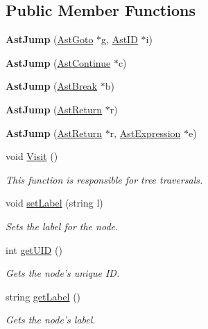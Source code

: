 \subsection*{Public Member Functions}
\begin{DoxyCompactItemize}
\item 
\hypertarget{classAstJump_a83a4aa905d84f3602374029976d99412}{{\bfseries Ast\-Jump} (\hyperlink{classAstGoto}{Ast\-Goto} $\ast$g, \hyperlink{classAstID}{Ast\-I\-D} $\ast$i)}\label{classAstJump_a83a4aa905d84f3602374029976d99412}

\item 
\hypertarget{classAstJump_a945a1bdc268bfa7f1fdd9f4d39bdef1a}{{\bfseries Ast\-Jump} (\hyperlink{classAstContinue}{Ast\-Continue} $\ast$c)}\label{classAstJump_a945a1bdc268bfa7f1fdd9f4d39bdef1a}

\item 
\hypertarget{classAstJump_a8b9e461b6a974f01889e89728afc7014}{{\bfseries Ast\-Jump} (\hyperlink{classAstBreak}{Ast\-Break} $\ast$b)}\label{classAstJump_a8b9e461b6a974f01889e89728afc7014}

\item 
\hypertarget{classAstJump_a083525b758ad6e931aee5ac850592730}{{\bfseries Ast\-Jump} (\hyperlink{classAstReturn}{Ast\-Return} $\ast$r)}\label{classAstJump_a083525b758ad6e931aee5ac850592730}

\item 
\hypertarget{classAstJump_ad80d35d23849aa369fef153fef4bb99e}{{\bfseries Ast\-Jump} (\hyperlink{classAstReturn}{Ast\-Return} $\ast$r, \hyperlink{classAstExpression}{Ast\-Expression} $\ast$e)}\label{classAstJump_ad80d35d23849aa369fef153fef4bb99e}

\item 
void \hyperlink{classAstJump_aca65cbe034ffdb439f6e3c73e40550ae}{Visit} ()
\begin{DoxyCompactList}\small\item\em This function is responsible for tree traversals. \end{DoxyCompactList}\item 
void \hyperlink{classAST_a71d680856e95ff89f55d5311a552eba6}{set\-Label} (string l)
\begin{DoxyCompactList}\small\item\em Sets the label for the node. \end{DoxyCompactList}\item 
int \hyperlink{classAST_ab7a5b1d9f1c2de0d98deb356f724a42c}{get\-U\-I\-D} ()
\begin{DoxyCompactList}\small\item\em Gets the node's unique I\-D. \end{DoxyCompactList}\item 
string \hyperlink{classAST_aee029be902fffc927d16ccb03eb922ad}{get\-Label} ()
\begin{DoxyCompactList}\small\item\em Gets the node's label. \end{DoxyCompactList}\end{DoxyCompactItemize}
